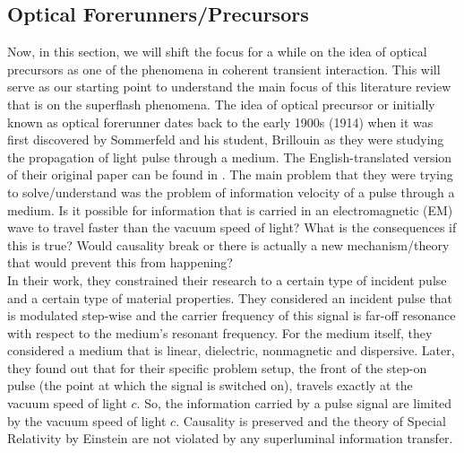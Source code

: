 \subsection{Optical Forerunners/Precursors}
Now, in this section, we will shift the focus for a while on the idea of optical precursors as one of the phenomena in coherent transient interaction. This will serve as our starting point to understand the main focus of this literature review that is on the superflash phenomena. The idea of optical precursor or initially known as optical forerunner dates back to the early 1900s (1914) when it was first discovered by Sommerfeld and his student, Brillouin as they were studying the propagation of light pulse through a medium. The English-translated version of their original paper can be found in \cite{brillouin1969wave}. The main problem that they were trying to solve/understand was the problem of information velocity of a pulse through a medium. Is it possible for information that is carried in an electromagnetic (EM) wave to travel faster than the vacuum speed of light? What is the consequences if this is true? Would causality break or there is actually a new mechanism/theory that would prevent this from happening?\\

In their work, they constrained their research to a certain type of incident pulse and a certain type of material properties. They considered an incident pulse that is modulated step-wise and the carrier frequency of this signal is far-off resonance with respect to the medium's resonant frequency. For the medium itself, they considered a medium that is linear, dielectric, nonmagnetic and dispersive. Later, they found out that for their specific problem setup, the front of the step-on pulse (the point at which the signal is switched on), travels exactly at the vacuum speed of light $c$. So, the information carried by a pulse signal are limited by the vacuum speed of light $c$. Causality is preserved and the theory of Special Relativity by Einstein are not violated by any superluminal information transfer.\\

